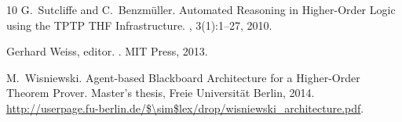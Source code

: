 \documentclass{llncs}
\begin{document}
\begin{thebibliography}{10}
G.~Sutcliffe and C.~Benzm{\"u}ller.
\newblock Automated Reasoning in Higher-Order Logic using the {TPTP THF}
  Infrastructure.
, 3(1):1--27, 2010.

Gerhard Weiss, editor.
.
\newblock MIT Press, 2013.

M.~Wisniewski.
\newblock Agent-based Blackboard Architecture for a Higher-Order Theorem
  Prover.
\newblock Master's thesis, Freie Universit\"at Berlin, 2014.
\newblock
  \url{http://userpage.fu-berlin.de/$\sim$lex/drop/wisniewski\_architecture.pdf}.

\end{thebibliography}
\end{document}

